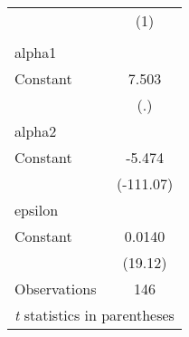 \begin{tabular}{l*{1}{c}}
\hline\hline
                    &\multicolumn{1}{c}{(1)}\\
                    &\multicolumn{1}{c}{}\\
\hline
alpha1              &            \\
Constant            &       7.503\\
                    &         (.)\\
\hline
alpha2              &            \\
Constant            &      -5.474\\
                    &   (-111.07)\\
\hline
epsilon             &            \\
Constant            &      0.0140\\
                    &     (19.12)\\
\hline
Observations        &         146\\
\hline\hline
\multicolumn{2}{l}{\footnotesize \textit{t} statistics in parentheses}\\
\end{tabular}
